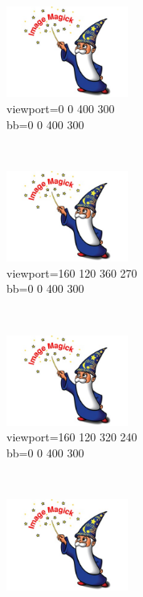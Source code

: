 \documentclass[french]{article}
\begin{document}
\begin{figure}[h]
    \centering
    \begin{subfigure}[b]{0.3\textwidth}
        \includegraphics[viewport=0 0 400 300,bb=0 0 400 300,width=4cm,height=3cm,clip=true]{test.jpg}
        \caption{viewport=0 0 400 300\\bb=0 0 400 300}
        \label{essai_a}
    \end{subfigure}
    ~ %
    \begin{subfigure}[b]{0.3\textwidth}
        \includegraphics[viewport=160 120 360 270,bb=0 0 400 300,width=4cm,height=3cm,clip=true]{test.jpg}
        \caption{viewport=160 120 360 270\\bb=0 0 400 300}%
        \label{essai_b}
    \end{subfigure}
    ~
    \begin{subfigure}[b]{0.3\textwidth}
        \includegraphics[viewport=160 120 320 240,bb=0 0 400 300,width=4cm,height=3cm,clip=true]{test.jpg}
        \caption{viewport=160 120 320 240\\bb=0 0 400 300}%
        \label{essai_c}
    \end{subfigure}
    \\
    \begin{subfigure}[b]{0.3\textwidth}
        \includegraphics[viewport=160 120 280 210,bb=0 0 400 300,width=4cm,height=3cm,clip=true]{test.jpg}

\end{subfigure}
\end{figure}
\end{document}
